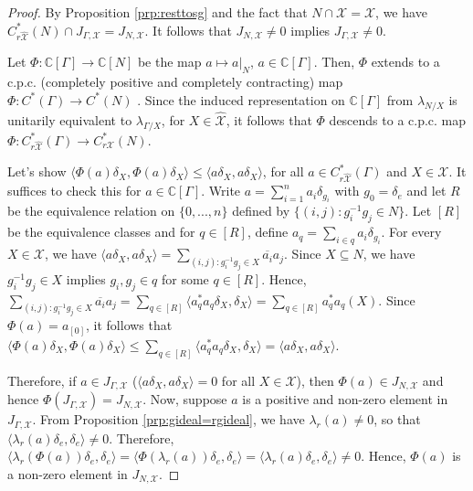 \documentclass[a4paper, 12pt]{amsart}
\theoremstyle{definition}
\theoremstyle{remark}
\numberwithin{equation}{section}
\begin{document}
\begin{proof}
By Proposition \ref{prp:resttosg} and the fact that $N\cap\mathcal{X} = \mathcal{X}$, we have $C^{*}_{r\hat{\mathcal{X}}}(N)\cap J_{\Gamma,\mathcal{X}} = J_{N,\mathcal{X}}$. It follows that $J_{N,\mathcal{X}}\neq 0$ implies $J_{\Gamma,\mathcal{X}}\neq 0$.

Let $\Phi:\mathbb{C}[\Gamma]\to \mathbb{C}[N]$ be the map $a\mapsto a|_{N}$, $a\in \mathbb{C}[\Gamma]$. Then, $\Phi$ extends to a c.p.c. (completely positive and completely contracting) map $\Phi:C^{*}(\Gamma)\to C^{*}(N)$ \cite{R74}. Since the induced representation on $\mathbb{C}[\Gamma]$ from $\lambda_{N/X}$ is unitarily equivalent to $\lambda_{\Gamma/X}$, for $X\in\hat{\mathcal{X}}$, it follows that $\Phi$ descends to a c.p.c. map $\Phi:C^{*}_{r\hat{\mathcal{X}}}(\Gamma)\to C^{*}_{r\mathcal{X}}(N)$. 

Let's show $\langle \Phi(a)\delta_{X}, \Phi(a)\delta_{X}\rangle \leq \langle a\delta_{X}, a\delta_{X}\rangle$, for all $a\in C^{*}_{r\hat{\mathcal{X}}}(\Gamma)$ and $X\in\mathcal{X}$. It suffices to check this for $a\in\mathbb{C}[\Gamma]$. Write $a = \sum^{n}_{i=1}a_{i}\delta_{g_{i}}$ with $g_{0} = \delta_{e}$ and let $R$ be the equivalence relation on $\{0,...,n\}$ defined by $\{(i,j): g_{i}^{-1}g_{j}\in N\}$. Let $[R]$ be the equivalence classes and for $q\in [R]$, define $a_{q} = \sum_{i\in q} a_{i}\delta_{g_{i}}$. For every $X\in\mathcal{X}$, we have $\langle  a\delta_{X},a\delta_{X}\rangle  = \sum_{(i,j):g^{-1}_{i}g_{j}\in X}\overline{a_{i}}a_{j}$. Since $X\subseteq N$, we have $g^{-1}_{i}g_{j}\in X$ implies $g_{i}, g_{j}\in q$ for some $q\in [R]$. Hence, $\sum_{(i,j):g^{-1}_{i}g_{j}\in X}\overline{a_{i}}a_{j} = \sum_{q\in [R]}\langle a^{*}_{q}a_{q}\delta_{X}, \delta_{X}\rangle
= \sum_{q\in [R]}a^{*}_{q}a_{q}(X)$. Since $\Phi(a) = a_{[0]}$, it follows that $\langle \Phi(a)\delta_{X}, \Phi(a)\delta_{X}\rangle \leq \sum_{q\in [R]}\langle a^{*}_{q}a_{q}\delta_{X}, \delta_{X}\rangle = \langle a\delta_{X}, a\delta_{X}\rangle.$

Therefore, if $a\in J_{\Gamma,\mathcal{X}}$ ($\langle a\delta_{X}, a\delta_{X}\rangle = 0$ for all $X\in\mathcal{X}$), then $\Phi(a)\in J_{N, \mathcal{X}}$ and hence $\Phi(J_{\Gamma,\mathcal{X}}) = J_{N,\mathcal{X}}$. Now, suppose $a$ is a positive and non-zero element in $J_{\Gamma,\mathcal{X}}$. From Proposition \ref{prp:gideal=rgideal}, we have $\lambda_{r}(a)\neq 0$, so that $\langle \lambda_{r}(a)\delta_{e}, \delta_{e}\rangle\neq 0$. Therefore, $\langle \lambda_{r}(\Phi(a))\delta_{e}, \delta_{e}\rangle = \langle \Phi(\lambda_{r}(a))\delta_{e}, \delta_{e}\rangle = \langle \lambda_{r}(a)\delta_{e}, \delta_{e}\rangle\neq 0$. Hence, $\Phi(a)$ is a non-zero element in $J_{N,\mathcal{X}}$.



\end{proof}
\end{document}

